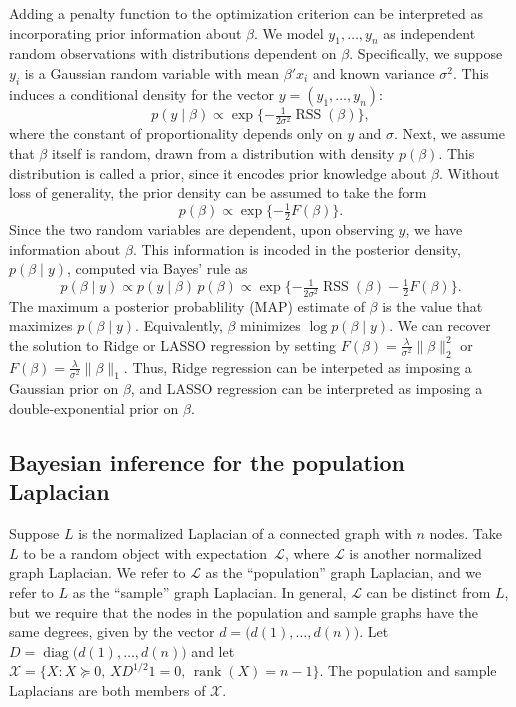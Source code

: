 \documentclass[12pt]{article}
\DeclareMathOperator*{\diag}{diag}
\DeclareMathOperator*{\rank}{rank}
\DeclareMathOperator*{\RSS}{RSS}
\theoremstyle{plain}
\begin{document}
Adding a penalty function to the optimization criterion can be
interpreted as incorporating prior information about $\beta$.  We
model $y_1, \dotsc, y_n$ as independent random observations with
distributions dependent on $\beta$.  Specifically, we suppose $y_i$ is
a Gaussian random variable with mean $\beta' x_i$ and known variance
$\sigma^2$.  This induces a conditional density for the vector
$y = (y_1, \dotsc, y_n)$:
\begin{equation}\label{E:regression-density}
  p(y \mid \beta)
    \propto
     \exp\{ -\tfrac{1}{2 \sigma^2} \RSS(\beta) \},
\end{equation}
where the constant of proportionality depends only on $y$ and $\sigma$.
Next, we assume that $\beta$ itself is random, drawn from a
distribution with density $p(\beta)$.  This distribution is called a
prior, since it encodes prior knowledge about $\beta$.  Without loss
of generality, the prior density can be assumed to take the form
\begin{equation}\label{E:regression-prior}
  p(\beta) \propto \exp\{ -\tfrac{1}{2} F(\beta) \}.
\end{equation}
Since the two random variables are dependent, upon observing $y$, we
have information about $\beta$.  This information is incoded in the
posterior density, $p(\beta \mid y)$, computed via
Bayes' rule as
\begin{equation}\label{E:regression-posterior}
  p(\beta \mid y)
    \propto p(y \mid \beta) \, p(\beta)
    \propto \exp\{ -\tfrac{1}{2 \sigma^2} \RSS(\beta) - \tfrac{1}{2} F(\beta) \}.
\end{equation}
The maximum a posterior probablility (MAP) estimate of $\beta$ is the
value that maximizes $p(\beta \mid y)$.  Equivalently, $\beta$
minimizes $\log p(\beta \mid y)$.  We can recover the solution to
Ridge or LASSO regression by setting
$F(\beta) = \tfrac{\lambda}{\sigma^2} \| \beta \|_2^2$ or
$F(\beta) = \tfrac{\lambda}{\sigma^2} \| \beta \|_1$.  Thus, Ridge
regression can be interpeted as imposing a Gaussian prior on $\beta$,
and LASSO regression can be interpreted as imposing a
double-exponential prior on $\beta$.


\subsection{Bayesian inference for the population Laplacian}

Suppose $L$ is the normalized Laplacian of a connected graph with $n$
nodes.  Take $L$ to be a random object with expectation~$\mathcal{L}$,
where $\mathcal{L}$ is another normalized graph Laplacian.  We refer to $\mathcal{L}$ as the
``population'' graph Laplacian, and we refer to $L$ as the ``sample''
graph Laplacian.  In general, $\mathcal{L}$ can be distinct from $L$,
but we require that the nodes in the population and sample graphs have
the same degrees, given by the vector $d = \big(d(1), \dotsc,
d(n)\big)$. Let $D = \diag\big(d(1), \dotsc, d(n)\big)$ and let
$\mathcal{X} = \{ X : X \succeq 0, \, X D^{1/2} 1 = 0, \, \rank(X) = n - 1 \}$.  The
population and sample Laplacians are both members of $\mathcal{X}$.
\end{document}
